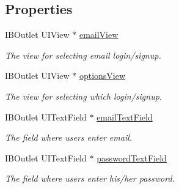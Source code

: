 \subsection*{Properties}
\begin{DoxyCompactItemize}
\item 
\hypertarget{interface_login_sign_up_a797d5135d8e0f5c3764e6c8e863628e8}{I\+B\+Outlet U\+I\+View $\ast$ \hyperlink{interface_login_sign_up_a797d5135d8e0f5c3764e6c8e863628e8}{email\+View}}\label{interface_login_sign_up_a797d5135d8e0f5c3764e6c8e863628e8}

\begin{DoxyCompactList}\small\item\em The view for selecting email login/signup. \end{DoxyCompactList}\item 
\hypertarget{interface_login_sign_up_a9e3a9ddb0ec8c4770478e8e96691aa70}{I\+B\+Outlet U\+I\+View $\ast$ \hyperlink{interface_login_sign_up_a9e3a9ddb0ec8c4770478e8e96691aa70}{options\+View}}\label{interface_login_sign_up_a9e3a9ddb0ec8c4770478e8e96691aa70}

\begin{DoxyCompactList}\small\item\em The view for selecting which login/signup. \end{DoxyCompactList}\item 
\hypertarget{interface_login_sign_up_aef2c833e97693b442b9bf988f7809826}{I\+B\+Outlet U\+I\+Text\+Field $\ast$ \hyperlink{interface_login_sign_up_aef2c833e97693b442b9bf988f7809826}{email\+Text\+Field}}\label{interface_login_sign_up_aef2c833e97693b442b9bf988f7809826}

\begin{DoxyCompactList}\small\item\em The field where users enter email. \end{DoxyCompactList}\item 
\hypertarget{interface_login_sign_up_aad42d499881b619e94e5bbab8b20ce40}{I\+B\+Outlet U\+I\+Text\+Field $\ast$ \hyperlink{interface_login_sign_up_aad42d499881b619e94e5bbab8b20ce40}{password\+Text\+Field}}\label{interface_login_sign_up_aad42d499881b619e94e5bbab8b20ce40}

\begin{DoxyCompactList}\small\item\em The field where users enter his/her password. \end{DoxyCompactList}\end{DoxyCompactItemize}


